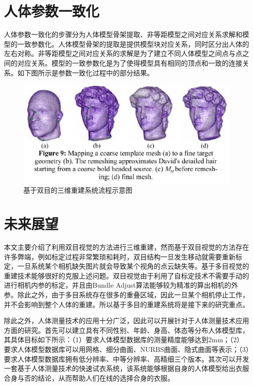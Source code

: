 \documentclass[10pt]{article}
\begin{document}
\section{人体参数一致化}
人体参数一致化的步骤分为人体模型骨架提取、非等距模型之间对应关系求解和模型的一致参数化。人体模型骨架的提取是提供模型块对应关系，同时区分出人体的左右对称。非等距模型之间对应关系的求解是为了建立不同人体模型之间点与点之间的对应关系。模型的一致参数化是为了使得模型具有相同的顶点和一致的连接关系。如下图所示是参数一致化过程中的部分结果。
\begin{figure}[H]
\begin{center}
\includegraphics[scale=0.3]{parameter.png}
\caption{基于双目的三维重建系统流程示意图}
\end{center}
\end{figure}


\section{未来展望}
本文主要介绍了利用双目视觉的方法进行三维重建，然而基于双目视觉的方法存在许多弊端，例如标定过程非常繁琐和耗时，双目结构一旦发生移动就需要重新标定，一旦系统某个相机缺失图片就会导致某个视角的点云缺失等。基于多目视觉的重建技术能够很好的克服上述问题。双目视觉由于利用了自标定技术不需要手动的进行相机内参的标定，并且由Bundle Adjust算法能够较为精准的算出相机的外参。除此之外，由于多目系统存在很多的重叠区域，因此一旦某个相机停止工作，并不会影响到整个人体的重建。所以基于多目的重建系统将是接下来的研究重点。
\par 除此之外，人体测量技术的应用十分广泛，因此可以开展针对于人体测量技术应用方面的研究。首先可以建立具有不同性别、年龄、身高、体态等分布人体模型库，其具体目标如下所示：（1）要求人体模型数据库的测量精度能够达到2mm；（2）要求人体模型数据库可以用网格、细分曲面、NURBS曲面、隐式曲面等表示；（3）要求人体模型数据库拥有低分辨率、中等分辨率、高精细三个版本。其次可以开发一套基于人体测量技术的快速试衣系统，该系统能够根据自身的人体模型给出衣服合身与否的结论，从而帮助人们在线的选择合身的衣服。
\end{document}
